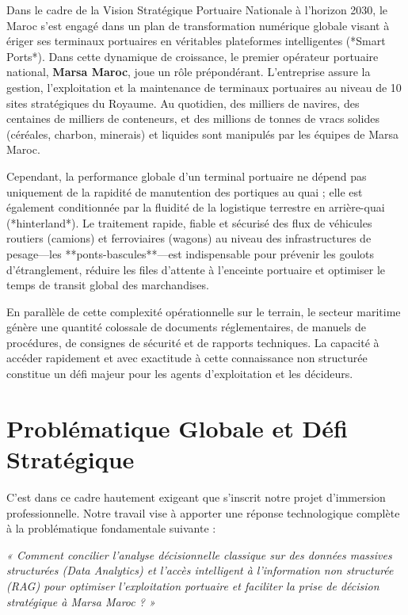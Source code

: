 \documentclass[12pt,a4paper,oneside]{report}
\begin{document}
Dans le cadre de la Vision Stratégique Portuaire Nationale à l'horizon 2030, le Maroc s'est engagé dans un plan de transformation numérique globale visant à ériger ses terminaux portuaires en véritables plateformes intelligentes (*Smart Ports*). Dans cette dynamique de croissance, le premier opérateur portuaire national, \textbf{Marsa Maroc}, joue un rôle prépondérant. L'entreprise assure la gestion, l'exploitation et la maintenance de terminaux portuaires au niveau de 10 sites stratégiques du Royaume. Au quotidien, des milliers de navires, des centaines de milliers de conteneurs, et des millions de tonnes de vracs solides (céréales, charbon, minerais) et liquides sont manipulés par les équipes de Marsa Maroc.

Cependant, la performance globale d'un terminal portuaire ne dépend pas uniquement de la rapidité de manutention des portiques au quai ; elle est également conditionnée par la fluidité de la logistique terrestre en arrière-quai (*hinterland*). Le traitement rapide, fiable et sécurisé des flux de véhicules routiers (camions) et ferroviaires (wagons) au niveau des infrastructures de pesage—les **ponts-bascules**—est indispensable pour prévenir les goulots d'étranglement, réduire les files d'attente à l'enceinte portuaire et optimiser le temps de transit global des marchandises.

En parallèle de cette complexité opérationnelle sur le terrain, le secteur maritime génère une quantité colossale de documents réglementaires, de manuels de procédures, de consignes de sécurité et de rapports techniques. La capacité à accéder rapidement et avec exactitude à cette connaissance non structurée constitue un défi majeur pour les agents d'exploitation et les décideurs.

\section*{Problématique Globale et Défi Stratégique}
C'est dans ce cadre hautement exigeant que s'inscrit notre projet d'immersion professionnelle. Notre travail vise à apporter une réponse technologique complète à la problématique fondamentale suivante :

\begin{center}
\begin{tcolorbox}[colback=royalblue!5!white,colframe=royalblue!80!black,arc=6pt,width=0.95\textwidth]
\centering \large \itshape
« Comment concilier l'analyse décisionnelle classique sur des données massives structurées (Data Analytics) et l'accès intelligent à l'information non structurée (RAG) pour optimiser l'exploitation portuaire et faciliter la prise de décision stratégique à Marsa Maroc ? »
\end{tcolorbox}
\end{center}
\end{document}
